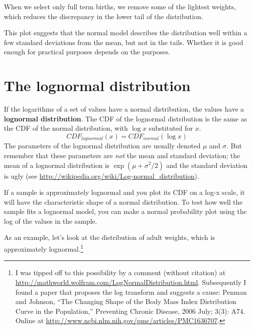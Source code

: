 When we select only full term births, we remove some of the lightest
weights, which reduces the discrepancy in the lower tail of the
distribution.

This plot suggests that the normal model describes the distribution
well within a few standard deviations from the mean, but not in the
tails.  Whether it is good enough for practical purposes depends
on the purposes.


\section{The lognormal distribution}
\label{brfss}
\label{lognormal}

If the logarithms of a set of values have a normal distribution, the
values have a {\bf lognormal distribution}.  The CDF of the lognormal
distribution is the same as the CDF of the normal distribution,
with $\log x$ substituted for $x$.
%
\[ CDF_{lognormal}(x) = CDF_{normal}(\log x)\]
%
The parameters of the lognormal distribution are usually denoted
$\mu$ and $\sigma$.  But remember that these parameters are {\em not}
the mean and standard deviation; the mean of a lognormal distribution
is $\exp(\mu +\sigma^2/2)$ and the standard deviation is
ugly (see \url{http://wikipedia.org/wiki/Log-normal_distribution}).
  

\begin{figure}
\end{figure}

If a sample is approximately lognormal and you plot its CDF on a
log-x scale, it will have the characteristic shape of a normal
distribution.  To test how well the sample fits a lognormal model, you
can make a normal probability plot using the log of the values
in the sample.

As an example, let's look at the distribution of adult weights, which
is approximately lognormal.\footnote{I was tipped off to this
  possibility by a comment (without citation) at
  \url{http://mathworld.wolfram.com/LogNormalDistribution.html}.
  Subsequently I found a paper that proposes the log transform and
  suggests a cause: Penman and Johnson, ``The Changing Shape of the
  Body Mass Index Distribution Curve in the Population,'' Preventing
  Chronic Disease, 2006 July; 3(3): A74.  Online at
  \url{http://www.ncbi.nlm.nih.gov/pmc/articles/PMC1636707}.}


